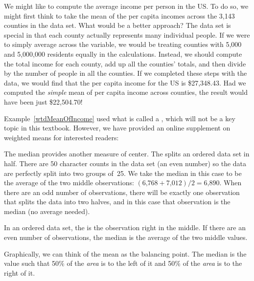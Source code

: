 \begin{example}{We might like to compute the average income per person in the US. To do so, we might first think to take the mean of the per capita incomes across the 3,143 counties in the  data set. What would be a better approach?} \label{wtdMeanOfIncome}
The  data set is special in that each county actually represents many individual people. If we were to simply average across the  variable, we would be treating counties with 5,000 and 5,000,000 residents equally in the calculations. Instead, we should compute the total income for each county, add up all the counties' totals, and then divide by the number of people in all the counties. If we completed these steps with the  data, we would find that the per capita income for the US is \$27,348.43. Had we computed the \emph{simple} mean of per capita income across counties, the result would have been just \$22,504.70!
\end{example}

Example~\ref{wtdMeanOfIncome} used what is called a , which will not be a key topic in this textbook. However, we have provided an online supplement on weighted means for interested readers:
\begin{center}
\end{center}

The median provides another measure of center. The  splits an ordered data set in half. There are 50 character counts in the  data set (an even number) so the data are perfectly split into two groups of~25. We take the median in this case to be the average of the two middle observations: $(\text{6,768} + \text{7,012}) / 2 = \text{6,890}$. When there are an odd number of observations, there will be exactly one observation that splits the data into two halves, and in this case that observation is the median (no average needed).

\begin{termBox}{
In an ordered data set, the  is the observation right in the middle. If there are an even number of observations, the median is the average of the two middle values.}
\end{termBox}

Graphically, we can think of the mean as the balancing point. The median is the value such that 50\% of the \emph{area} is to the left of it and 50\% of the \emph{area} is to the right of it.

